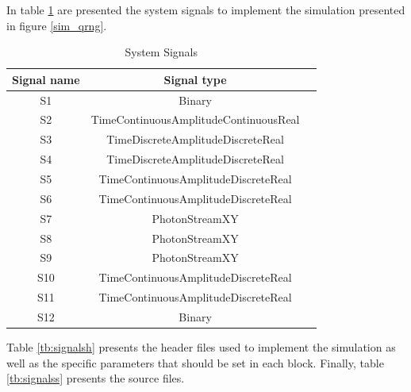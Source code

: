 In table \ref{tb:signals2} are presented the system signals to implement the simulation presented in figure \ref{sim_qrng}.
\begin{table}[H]
\centering
\caption{System Signals}
\label{tb:signals2}
\begin{tabular}{|c|c|c|}
\hline
\textbf{Signal name}                            & \textbf{Signal type}                      \\ \hline
S1                                              &  Binary                                   \\ \hline
S2                                              &  TimeContinuousAmplitudeContinuousReal    \\ \hline
S3                                              &  TimeDiscreteAmplitudeDiscreteReal        \\ \hline
S4                                              &  TimeDiscreteAmplitudeDiscreteReal        \\ \hline
S5                                              &  TimeContinuousAmplitudeDiscreteReal      \\ \hline
S6                                              &  TimeContinuousAmplitudeDiscreteReal      \\ \hline
S7                                              &  PhotonStreamXY                           \\ \hline
S8                                              &  PhotonStreamXY                           \\ \hline
S9                                              &  PhotonStreamXY                           \\ \hline
S10                                             &  TimeContinuousAmplitudeDiscreteReal      \\ \hline
S11                                             &  TimeContinuousAmplitudeDiscreteReal      \\ \hline
S12                                             &  Binary                                   \\ \hline
\end{tabular}
\end{table}

Table \ref{tb:signalsh} presents the header files used to implement the simulation as well as the specific parameters that should be set in each block. Finally, table \ref{tb:signalss} presents the source files.

